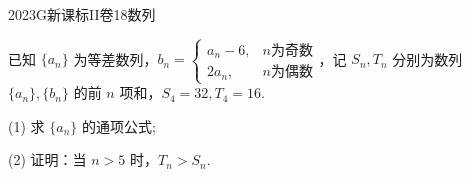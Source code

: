 
\begin{problem}{2023}{G}{新课标II卷}{18}{数列}

已知 $\{a_n\}$ 为等差数列，$b_n=\begin{cases} a_n-6, & n \text{为奇数} \\ 2a_n, & n \text{为偶数} \end{cases}$，记 $S_n, T_n$ 分别为数列 $\{a_n\}, \{b_n\}$ 的前 $n$ 项和，$S_4=32, T_4=16$.

(1) 求 $\{a_n\}$ 的通项公式;

(2) 证明：当 $n>5$ 时，$T_n>S_n$.

\end{problem}